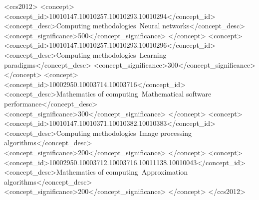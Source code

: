 \documentclass[sigconf, nonacm]{acmart}
\begin{document}
\begin{CCSXML}
<ccs2012>
 <concept>
  <concept_id>10010147.10010257.10010293.10010294</concept_id>
  <concept_desc>Computing methodologies~Neural networks</concept_desc>
  <concept_significance>500</concept_significance>
 </concept>
 <concept>
  <concept_id>10010147.10010257.10010293.10010296</concept_id>
  <concept_desc>Computing methodologies~Learning paradigms</concept_desc>
  <concept_significance>300</concept_significance>
 </concept>
 <concept>
  <concept_id>10002950.10003714.10003716</concept_id>
  <concept_desc>Mathematics of computing~Mathematical software performance</concept_desc>
  <concept_significance>300</concept_significance>
 </concept>
 <concept>
  <concept_id>10010147.10010371.10010382.10010383</concept_id>
  <concept_desc>Computing methodologies~Image processing algorithms</concept_desc>
  <concept_significance>200</concept_significance>
 </concept>
 <concept>
  <concept_id>10002950.10003712.10003716.10011138.10010043</concept_id>
  <concept_desc>Mathematics of computing~Approximation algorithms</concept_desc>
  <concept_significance>200</concept_significance>
 </concept>
</ccs2012>
\end{CCSXML}





\maketitle
\end{document}
